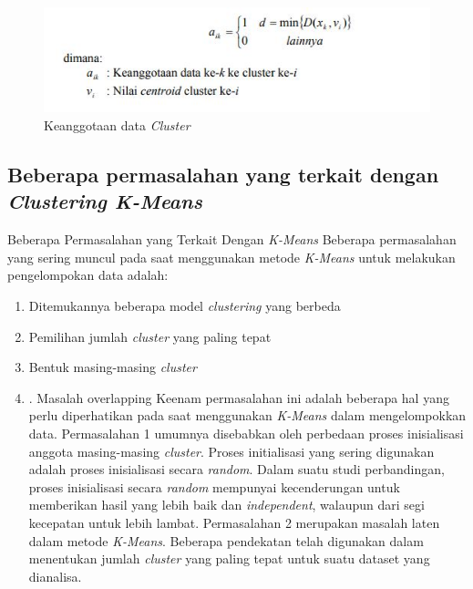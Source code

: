 \begin{figure}[h]
\centering
\includegraphics[scale=0.6]{chapters/figures/metclus.JPG}
\caption{Keanggotaan data \textit{Cluster}}
\end{figure}

\subsection{Beberapa permasalahan yang terkait dengan \textit{Clustering K-Means}}
\par Beberapa Permasalahan yang Terkait Dengan \textit{K-Means} Beberapa permasalahan yang sering muncul pada saat menggunakan metode \textit{K-Means} untuk melakukan pengelompokan data adalah: 
\begin{enumerate}
    \item Ditemukannya beberapa model \textit{clustering} yang berbeda 
    \item Pemilihan jumlah \textit{cluster} yang paling tepat 
    \item Bentuk masing-masing \textit{cluster}
    \item . Masalah overlapping Keenam permasalahan ini adalah beberapa hal yang perlu diperhatikan pada saat menggunakan \textit{K-Means} dalam mengelompokkan data. Permasalahan 1 umumnya disebabkan oleh perbedaan proses inisialisasi anggota masing-masing \textit{cluster}. Proses initialisasi yang sering digunakan adalah proses inisialisasi secara \textit{random}. Dalam suatu studi perbandingan, proses inisialisasi secara \textit{random} mempunyai kecenderungan untuk memberikan hasil yang lebih baik dan \textit{independent}, walaupun dari segi kecepatan untuk lebih lambat. Permasalahan 2 merupakan masalah laten dalam metode \textit{K-Means}. Beberapa pendekatan telah digunakan dalam menentukan jumlah \textit{cluster} yang paling tepat untuk suatu dataset yang dianalisa. 
\end{enumerate}
